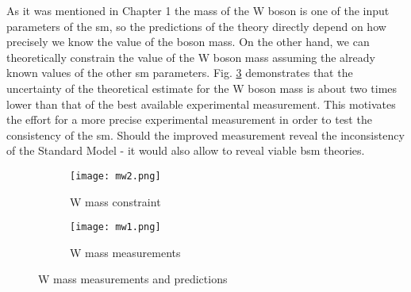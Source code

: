     As it was mentioned in Chapter 1 the mass of the W boson is one of the input parameters of the \gls{sm}, so the predictions of the theory directly depend on how precisely we know the value of the boson mass. On the other hand, we can theoretically constrain the value of the W boson mass assuming the already known values of the other \gls{sm} parameters. Fig. \ref{fig::w_values} demonstrates that the uncertainty of the theoretical estimate for the W boson mass is about two times lower than that of the best available experimental measurement. This motivates the effort for a more precise experimental measurement in order to test the consistency of the \gls{sm}. Should the improved measurement reveal the inconsistency of the Standard Model - it would also allow to reveal viable \gls{bsm} theories. 
    	\begin{figure}[htbp]
    	\begin{subfigure}[t]{0.48\textwidth}
    		\texttt{[image: mw2.png]}
    		\caption[Side view]{W mass constraint \cite{Haller2018}}
    		\label{fig::w_constraint}
    	\end{subfigure}
    	\hfill
    	\begin{subfigure}[t]{0.48\textwidth} 
    		\texttt{[image: mw1.png]}
    		\caption[Transverse view]{W mass measurements}
    		\label{fig::w_measurement}
    	\end{subfigure}
    	\caption{W mass measurements and predictions}
    	\label{fig::w_values}
    \end{figure}
